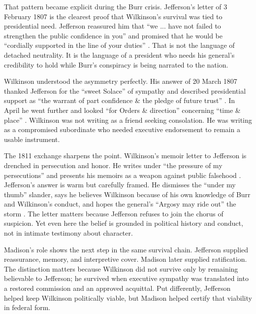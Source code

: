 That pattern became explicit during the Burr crisis. Jefferson's letter of 3 February 1807 is the clearest proof that Wilkinson's survival was tied to presidential need. Jefferson reassured him that ``we ... have not failed to strengthen the public confidence in you'' and promised that he would be ``cordially supported in the line of your duties'' \citep{jefferson1807}. That is not the language of detached neutrality. It is the language of a president who needs his general's credibility to hold while Burr's conspiracy is being narrated to the nation.

Wilkinson understood the asymmetry perfectly. His answer of 20 March 1807 thanked Jefferson for the ``sweet Solace'' of sympathy and described presidential support as ``the warrant of part confidence \& the pledge of future trust'' \citep{wilkinson1807a}. In April he went further and looked ``for Orders \& direction'' concerning ``time \& place'' \citep{wilkinson1807b}. Wilkinson was not writing as a friend seeking consolation. He was writing as a compromised subordinate who needed executive endorsement to remain a usable instrument.

The 1811 exchange sharpens the point. Wilkinson's memoir letter to Jefferson is drenched in persecution and honor. He writes under ``the pressure of my persecutions'' and presents his memoirs as a weapon against public falsehood \citep{wilkinson1811}. Jefferson's answer is warm but carefully framed. He dismisses the ``under my thumb'' slander, says he believes Wilkinson because of his own knowledge of Burr and Wilkinson's conduct, and hopes the general's ``Argosy may ride out'' the storm \citep{jefferson1811}. The letter matters because Jefferson refuses to join the chorus of suspicion. Yet even here the belief is grounded in political history and conduct, not in intimate testimony about character.

Madison's role shows the next step in the same survival chain. Jefferson supplied reassurance, memory, and interpretive cover. Madison later supplied ratification. The distinction matters because Wilkinson did not survive only by remaining believable to Jefferson; he survived when executive sympathy was translated into a restored commission and an approved acquittal. Put differently, Jefferson helped keep Wilkinson politically viable, but Madison helped certify that viability in federal form.




